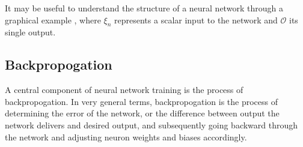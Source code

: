 \documentclass{article}
\begin{document}
It may be useful to understand the structure of a neural network through a graphical example \cite{neurondiagrams}, where $\xi_n$ represents a scalar input to the network and $\mathcal{O}$ its single output.
\begin{center}
\end{center}

\subsection{Backpropogation}
A central component of neural network training is the process of backpropogation. In very general terms, backpropogation is the process of determining the error of the network, or the difference between output the network delivers and desired output, and subsequently going backward through the network and adjusting neuron weights and biases accordingly.
\end{document}
